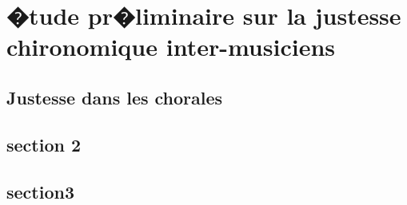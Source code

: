 \chapter{�tude pr�liminaire sur la justesse chironomique inter-musiciens}
\label{Sec:justess_inter}
\minitoc
\cleardoublepage



\section{Justesse dans les chorales}
\label{Sec:justesseChorale}
\lipsum[1-2]

\section{section 2}
\lipsum[1-2]

\section{section3}
\lipsum[1-2]